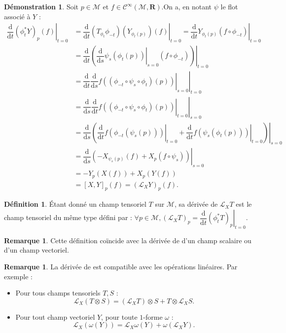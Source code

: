 \documentclass[12pt,a4paper]{article}
\theoremstyle{definition}
\newtheorem{defn}[thm]{Définition}
\newtheorem{rqe}[thm]{Remarque}
\newtheorem*{dem}{Démonstration}
\begin{document}
\begin{dem}
Soit $p\in\mathcal{M}$ et $f\in\mathcal{C}^\infty(\mathcal{M},\mathbf{R})$.\newline On a, en notant $\psi$ le flot associé à $Y$ :
\begin{align*}
\left.\dfrac{\mathrm{d}}{\mathrm{d}t}(\phi_t^*Y)_p(f)\right|_{t=0}&=\left.\dfrac{\mathrm{d}}{\mathrm{d}t}\left(T_{\phi_t}\phi_{-t}\right)(Y_{\phi_t(p)})(f)\right|_{t=0}=\left.\dfrac{\mathrm{d}}{\mathrm{d}t}Y_{\phi_t(p)}(f\circ\phi_{-t})\right|_{t=0}\\&=\left.\dfrac{\mathrm{d}}{\mathrm{d}t}\left(\left.\dfrac{\mathrm{d}}{\mathrm{d}s}\psi_s(\phi_t(p))\right|_{s=0}(f\circ\phi_{-t})\right)\right|_{t=0}\\&=\left.\dfrac{\mathrm{d}}{\mathrm{d}t}\left.\dfrac{\mathrm{d}}{\mathrm{d}s}f((\phi_{-t}\circ\psi_s\circ\phi_t)(p))\right|_{s=0}\right|_{t=0}\\&=\left.\dfrac{\mathrm{d}}{\mathrm{d}s}\left.\dfrac{\mathrm{d}}{\mathrm{d}t}f((\phi_{-t}\circ\psi_s\circ\phi_t)(p))\right|_{t=0}\right|_{s=0}\\&=\left.\dfrac{\mathrm{d}}{\mathrm{d}s}\left(\left.\dfrac{\mathrm{d}}{\mathrm{d}t}f(\phi_{-t}(\psi_s(p)))\right|_{t=0}+\left.\dfrac{\mathrm{d}}{\mathrm{d}t}f(\psi_s(\phi_t(p)))\right|_{t=0}\right)\right|_{s=0}\\&=\left.\dfrac{\mathrm{d}}{\mathrm{d}s}\left(-X_{\psi_s(p)}(f)+X_p(f\circ\psi_s)\right)\right|_{s=0}\\&=-Y_p(X(f))+X_p(Y(f))\\&=[X,Y]_p(f)=(\mathcal{L}_XY)_p(f).
\end{align*}
\end{dem}
\begin{defn}
Étant donné un champ tensoriel $T$ sur $\mathcal{M}$, sa dérivée de  $\mathcal{L}_XT$ est le champ tensoriel du même type défini par : $\forall p\in\mathcal{M}, (\mathcal{L}_XT)_p=\left.\dfrac{\mathrm{d}}{\mathrm{d}t}\left(\phi_t^*T\right)_p\right|_{t=0}$.
\end{defn}
\begin{rqe}
Cette définition coïncide avec la dérivée de  d'un champ scalaire ou d'un champ vectoriel.
\end{rqe}
\begin{rqe}
La dérivée de  est compatible avec les opérations linéaires. Par exemple :
\begin{itemize}
\item Pour tous champs tensoriels $T,S$ : $$\mathcal{L}_X(T\otimes S)=(\mathcal{L}_XT)\otimes S+T\otimes \mathcal{L}_X S.$$
\item Pour tout champ vectoriel $Y$, pour toute $1$-forme $\omega$ : $$\mathcal{L}_X(\omega(Y))=\mathcal{L}_X\omega(Y)+\omega(\mathcal{L}_XY).$$
\end{itemize}
\end{rqe}
\end{document}
